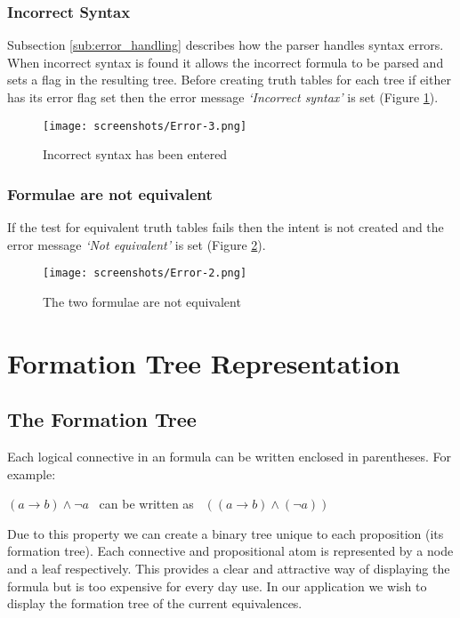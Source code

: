 \documentclass[draft]{report}
\begin{document}
\subsubsection{Incorrect Syntax}

Subsection \ref{sub:error_handling} describes how the parser handles syntax errors. When incorrect syntax is found it allows the incorrect formula to be parsed and sets a flag in the resulting tree. Before creating truth tables for each tree if either has its error flag set then the error message \textit{`Incorrect syntax'} is set (Figure \ref{error3}).

\begin{figure}[ht!]
    \centering
    \texttt{[image: screenshots/Error-3.png]}
    \caption{Incorrect syntax has been entered}
    \label{error3}
\end{figure}

\subsubsection{Formulae are not equivalent}

If the test for equivalent truth tables fails then the intent is not created and the error message \textit{`Not equivalent'} is set (Figure \ref{error2}).

\begin{figure}[ht!]
    \centering
    \texttt{[image: screenshots/Error-2.png]}
    \caption{The two formulae are not equivalent}
    \label{error2}
\end{figure}

\section{Formation Tree Representation}
\label{sec:formation_tree_representation}

\subsection{The Formation Tree}

Each logical connective in an formula can be written enclosed in parentheses. For example:

\begin{center}
$(a\to b)\land \neg a$ \ can be written as \ $((a\to b)\land (\neg a))$
\end{center}

Due to this property we can create a binary tree unique to each proposition (its formation tree). Each connective and propositional atom is represented by a node and a leaf respectively. This provides a clear and attractive way of displaying the formula but is too expensive for every day use. In our application we wish to display the formation tree of the current equivalences.
\end{document}
